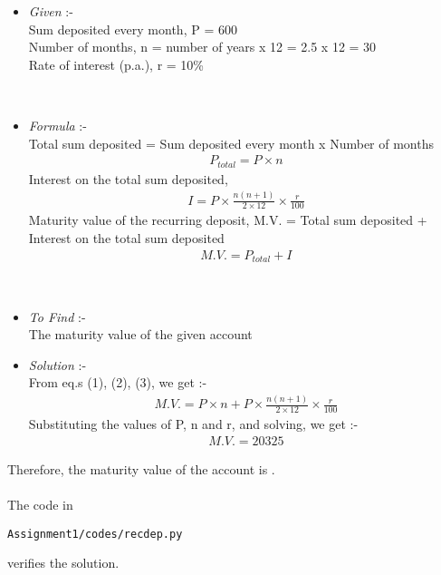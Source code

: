 \documentclass[journal,12pt,twocolumn]{IEEEtran}
\begin{document}
\solution
\begin{itemize}

    \item \emph{Given} :-
                \\
                Sum deposited every month, P = 600
                \\
                Number of months, n = number of years x 12 = 2.5 x 12 = 30
                \\
                Rate of interest (p.a.), r = 10\%
                \\
    		\begin{table}[ht!]
			\\
			\caption{}
		\end{table}
    \item \emph{Formula} :-
                \\
                Total sum deposited = Sum deposited every month x Number of months
                \begin{align}
                    P_{total} = P \times n
                \end{align}
                Interest on the total sum deposited,
                \begin{align}
                    I = P \times \frac{n(n + 1)}{2 \times 12} \times \frac{r}{100}
                \end{align}
                Maturity value of the recurring deposit, M.V. = Total sum deposited + Interest on the total sum deposited
                \begin{align}
                    M.V. = P_{total} + I
                \end{align}
		\begin{table}[ht!]
			\\
			\caption{}
		\end{table}

    \item \emph{To Find} :-
                \\
                The maturity value of the given account
                \\

    \item \emph{Solution} :-
                \\
                From eq.s (1), (2), (3), we get :-
                \begin{align}
                    M.V. = P \times n + P \times \frac{n(n + 1)}{2 \times 12} \times \frac{r}{100}
                \end{align}
                Substituting the values of P, n and r, and solving, we get :-
                \begin{align}
                    M.V. = 20325
                \end{align}

\end{itemize}

Therefore, the maturity value of the account is .\\
\\
The code in
\begin{lstlisting}
Assignment1/codes/recdep.py
\end{lstlisting}
verifies the solution.
\end{document}
